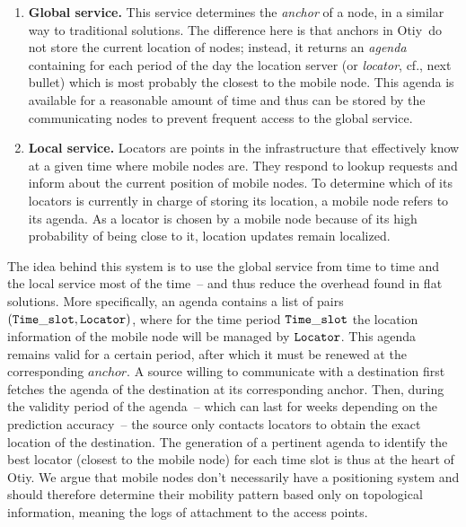 \documentclass[a4paper]{sig-alternate-10pt}
\newcommand{\otiy}{{\sffamily Otiy}}
\begin{document}
\begin{enumerate}

\item {\bf Global service.} This service determines the {\it anchor}
of a node, in a similar way to traditional solutions. The difference
here is that anchors in \otiy\ do not store the current location of
nodes; instead, it returns an {\it agenda} containing for each
period of the day the location server (or {\it locator}, cf., next
bullet) which is most probably the closest to the mobile node. This
agenda is available for a reasonable amount of time and thus can be
stored by the communicating nodes to prevent frequent access to the
global service.

\item {\bf Local service.} Locators are points in the infrastructure
that effectively know at a given time where mobile nodes are. They respond to lookup
requests and inform about the current position of mobile nodes. To
determine which of its locators is currently in charge of storing
its location, a mobile node refers to its agenda. As a locator is
chosen by a  mobile node because of its high probability of being
close to it, location  updates remain localized.

\end{enumerate}

The idea behind this system is to use the global service from time
to time and the local service most of the time~-- and thus reduce
the overhead found in flat solutions. More specifically, an agenda
contains a list of  pairs ${\tt (Time\_slot, Locator)}$, where for
the time period ${\tt Time\_slot}$ the location information of the
mobile node will be managed by ${\tt Locator}$. This agenda remains
valid for a certain period, after which it must be renewed at the
corresponding $anchor$. A source willing to communicate with a
destination first fetches the agenda of the destination at its
corresponding anchor. Then, during the validity period of the
agenda~-- which can last for weeks depending on the prediction
accuracy~-- the source only contacts locators to obtain the exact
location of the destination. The generation of a pertinent agenda to
identify the best locator (closest to the mobile node) for each time
slot is thus at the heart of \otiy. We argue that mobile nodes don't
necessarily have a positioning system and should therefore determine
their mobility pattern based only on topological information,
meaning the logs of attachment to the access points.
\end{document}
